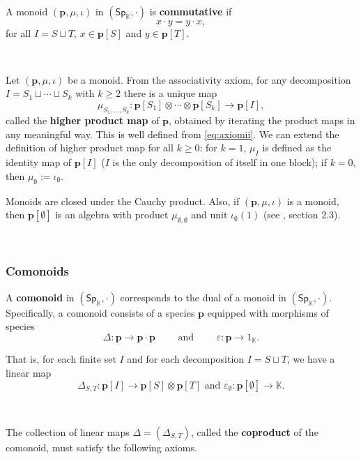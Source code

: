 \documentclass[12pt, reqno]{amsart}
\theoremstyle{definition}
\newcommand{\Ssk}{\mathsf{Sp}_\Kb} %
\newcommand{\Kb}{\mathbb{K}}
\newcommand{\tp}{\mathbf{p}}
\begin{document}
\

A monoid $(\tp, \mu, \iota)$ in $(\Ssk, \cdot)$ is {\bf commutative} if
\begin{equation*}
    x\cdot y=y\cdot x,
\end{equation*}
for all $I=S \sqcup T$, $x \in \tp[S]$ and $y \in \tp[T]$.

\

Let $(\tp, \mu, \iota)$ be a monoid. From the associativity axiom, for any decomposition $I=S_1 \sqcup \cdots \sqcup S_k$ with $k \geq 2$ there is a unique map
\begin{equation}
    \mu_{S_1, \hdots, S_k}: \tp[S_1]\otimes \cdots \otimes \tp[S_k] \to \tp[I],
\end{equation}
called the {\bf higher product map} of $\tp$, obtained by iterating the product maps in any meaningful way. 
This is well defined from \eqref{eq:axiomii}.
We can extend the definition of higher product map for all $k\geq 0$: for $k=1$, $\mu_I$ is defined as the identity map of $\tp[I]$ ($I$ is the only decomposition of itself in one block); if $k=0$, then $\mu_{\emptyset }:=\iota_{\emptyset }$.
\

Monoids are closed under the Cauchy product. Also, if $(\tp, \mu, \iota)$ is a monoid, then $\tp[\emptyset]$ is an algebra with product $\mu_{\emptyset, \emptyset}$ and unit $\iota_\emptyset(1)$ (see \cite{AM2013}, section 2.3).


\

\subsubsection{Comonoids}
A {\bf comonoid} in $(\Ssk, \cdot)$ corresponds to the dual of a monoid in $(\Ssk, \cdot)$.
Specifically, a comonoid consists of a species $\tp$ equipped with morphisms of species
\begin{equation*}
    \Delta: \tp \to \tp \cdot \tp \qquad \text{ and } \qquad \varepsilon: \tp \to 1_{\mathbb{K}}.
\end{equation*}

That is, for each finite set $I$ and for each decomposition $I=S \sqcup T$, we have a linear map 
\begin{equation*}
    \Delta_{S,T}: \tp[I] \to \tp[S] \otimes \tp[T] \text{ and } \varepsilon_\emptyset: \tp[\emptyset] \to \mathbb{K}.
\end{equation*}

\

The collection of linear maps $\Delta=(\Delta_{S,T})$, called the {\bf coproduct} of the comonoid, must satisfy the following axioms.
\end{document}
